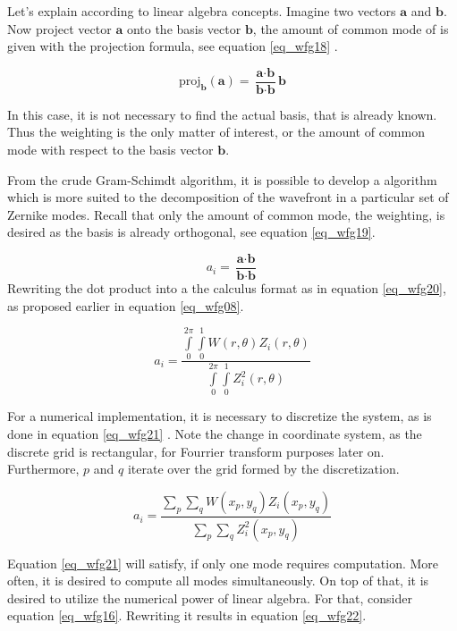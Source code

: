 \documentclass{article}
\begin{document}
Let's explain according to linear algebra concepts. Imagine two vectors $\textbf{a}$ and $\textbf{b}$. Now project vector $\textbf{a}$ onto the basis vector $\textbf{b}$, the amount of common mode of is given with the projection formula, see equation \ref{eq_wfg18} \cite{lay}.

\begin{equation}
\text{proj}_{\textbf{b}}(\textbf{a}) = \frac{\textbf{a} \cdot \textbf{b}}{\textbf{b} \cdot \textbf{b}} \textbf{b}
\label{eq_wfg18}
\end{equation}

In this case, it is not necessary to find the actual basis, that is already known. Thus the weighting is the only matter of interest, or the amount of common mode with respect to the basis vector $\textbf{b}$.  

From the crude Gram-Schimdt algorithm, it is possible to develop a algorithm which is more suited to the decomposition of the wavefront in a particular set of Zernike modes. Recall that only the amount of common mode, the weighting,  is desired as the basis is already orthogonal, see equation \ref{eq_wfg19}.

\begin{equation}
a_i =  \frac{\textbf{a} \cdot \textbf{b}}{\textbf{b} \cdot \textbf{b}}
\label{eq_wfg19}
\end{equation}
Rewriting the dot product into a the calculus format as in equation \ref{eq_wfg20}, as proposed earlier in equation \ref{eq_wfg08}.

\begin{equation}
a_i = \frac{\int \limits_{0}^{2\pi} \int \limits_{0}^{1} W(r,\theta) Z_i(r,\theta)}{\int \limits_{0}^{2\pi} \int \limits_{0}^{1} Z_{i}^{2}(r,\theta) }
\label{eq_wfg20}
\end{equation}

For a numerical implementation, it is necessary to discretize the system, as is done in equation \ref{eq_wfg21} \cite{zernikeMatlab}. Note the change in coordinate system, as the discrete grid is rectangular, for Fourrier transform purposes later on. Furthermore, $p$ and $q$ iterate over the grid formed by the discretization.

\begin{equation}
a_i = \frac{\sum \limits_p \sum \limits_q W(x_p,y_q) Z_i(x_p,y_q) }{\sum \limits_p \sum \limits_q Z_{i}^{2}(x_p,y_q) } 
\label{eq_wfg21}
\end{equation}

\newpage
Equation \ref{eq_wfg21} will satisfy, if only one mode requires computation. More often, it is desired to compute all modes simultaneously. On top of that, it is desired to utilize the numerical power of linear algebra.
For that, consider equation \ref{eq_wfg16}. Rewriting it results in equation \ref{eq_wfg22}.
\end{document}
